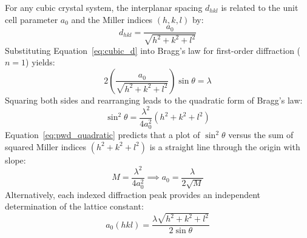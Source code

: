 \documentclass[12pt,a4paper]{article}
\begin{document}
For any cubic crystal system, the interplanar spacing $d_{hkl}$ is related to the unit cell parameter $a_0$ and the Miller indices $(h, k, l)$ by:
\begin{equation}
    d_{hkl} = \frac{a_0}{\sqrt{h^2 + k^2 + l^2}}
    \label{eq:cubic_d}
\end{equation}
Substituting Equation~\eqref{eq:cubic_d} into Bragg's law for first-order diffraction ($n=1$) yields:
\begin{equation}
    2\left(\frac{a_0}{\sqrt{h^2 + k^2 + l^2}}\right)\sin\theta = \lambda
\end{equation}
Squaring both sides and rearranging leads to the quadratic form of Bragg's law:
\begin{equation}
    \sin^2\theta = \frac{\lambda^2}{4a_0^2}(h^2 + k^2 + l^2)
    \label{eq:pwd_quadratic}
\end{equation}
Equation~\eqref{eq:pwd_quadratic} predicts that a plot of $\sin^2\theta$ versus the sum of squared Miller indices $(h^2 + k^2 + l^2)$ is a straight line through the origin with slope:
\begin{equation}
    M = \frac{\lambda^2}{4a_0^2} \implies a_0 = \frac{\lambda}{2\sqrt{M}}
    \label{eq:pwd_slope_a0}
\end{equation}
Alternatively, each indexed diffraction peak provides an independent determination of the lattice constant:
\begin{equation}
    a_0(hkl) = \frac{\lambda \sqrt{h^2 + k^2 + l^2}}{2\sin\theta}
    \label{eq:pwd_individual_a0}
\end{equation}
\end{document}
